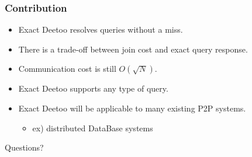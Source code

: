 \documentclass[red]{beamer}
\begin{document}
\begin{frame}
\frametitle{Contribution}
\begin{itemize}
\item Exact Deetoo resolves queries without a miss.
\item There is a trade-off between join cost and exact query response.
\item Communication cost is still $O(\sqrt{N})$.
\item Exact Deetoo supports any type of query.
\item Exact Deetoo will be applicable to many existing P2P systems.
\begin{itemize}
\item ex) distributed DataBase systems
\end{itemize}
\end{itemize}
\end{frame}

\begin{frame}
\begin{center}
\centering                        \huge Questions?
\end{center}
\end{frame}
\end{document}
